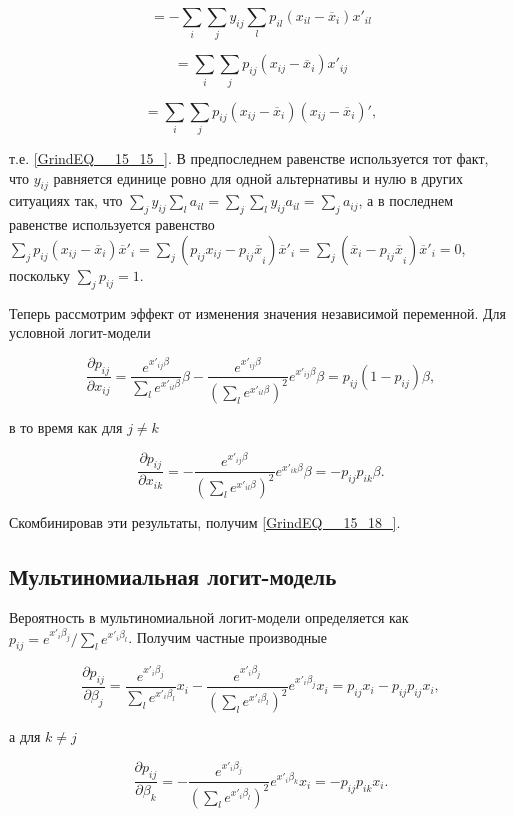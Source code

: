 \[=-\sum_i{\sum_j{y_{ij}\sum_l{p_{il}\left(x_{il}-{\overline{x}}_i\right)x'_{il}}}}\] 

\[=\sum_i{\sum_j{p_{ij}\left(x_{ij}-{\overline{x}}_i\right)x'_{ij}}}\] 

\[=\sum_i{\sum_j{p_{ij}\left(x_{ij}-{\overline{x}}_i\right)\left(x_{ij}-{\overline{x}}_i\right)'}},\] 

т.е. \eqref{GrindEQ__15_15_}. В предпоследнем равенстве используется тот факт, что $y_{ij}$ равняется единице ровно для одной альтернативы и нулю в других ситуациях так, что $\sum_j{y_{ij}\sum_l{a_{il}}}=\sum_j{\sum_l{y_{ij}a_{il}}}=\sum_j{a_{ij}}$, а в последнем равенстве используется равенство $\sum_j{p_{ij}\left(x_{ij}-{\overline{x}}_i\right){\overline{x}}'_i}=\sum_j{\left(p_{ij}x_{ij}-{p_{ij}\overline{x}}_i\right){\overline{x}}'_i}=\sum_j{({\overline{x}}_i-{p_{ij}\overline{x}}_i)}{\overline{x}}'_i = 0$, поскольку $\sum_j{p_{ij}=1}$.

Теперь рассмотрим эффект от изменения значения независимой переменной. Для условной логит-модели

\[\frac{\partial p_{ij}}{\partial x_{ij}}=\frac{e^{x'_{ij}\beta }}{\sum_l{e^{x'_{il}\beta }}}\beta -\frac{e^{x'_{ij}\beta }}{{\left(\sum_l{e^{x'_{il}\beta }}\right)}^2}e^{x'_{ij}\beta }\beta =p_{ij}\left(1-p_{ij}\right)\beta ,\] 

в то время как для $j\ne k$

\[\frac{\partial p_{ij}}{\partial x_{ik}}=-\frac{e^{x'_{ij}\beta }}{{\left(\sum_l{e^{x'_{il}\beta }}\right)}^2}e^{x'_{ik}\beta }\beta =-p_{ij}p_{ik}\beta .\] 

Скомбинировав эти результаты, получим \eqref{GrindEQ__15_18_}.

\subsection{Мультиномиальная логит-модель}

Вероятность в мультиномиальной логит-модели определяется как $p_{ij}={e^{x'_i{\beta }_j}}/{\sum_l{e^{x'_i{\beta }_l}}}$. Получим частные производные

\[\frac{\partial p_{ij}}{\partial {\beta }_j}=\frac{e^{x'_i{\beta }_j}}{\sum_l{e^{x'_i{\beta }_l}}}x_i-\frac{e^{x'_i{\beta }_j}}{{\left(\sum_l{e^{x'_i{\beta }_l}}\right)}^2}e^{x'_i{\beta }_j}x_i=p_{ij}x_i-p_{ij}p_{ij}x_i,\] 

а для $k\ne j$

\[\frac{\partial p_{ij}}{\partial {\beta }_k}=-\frac{e^{x'_i{\beta }_j}}{{\left(\sum_l{e^{x'_i{\beta }_l}}\right)}^2}e^{x'_i{\beta }_k}x_i=-p_{ij}p_{ik}x_i.\] 

